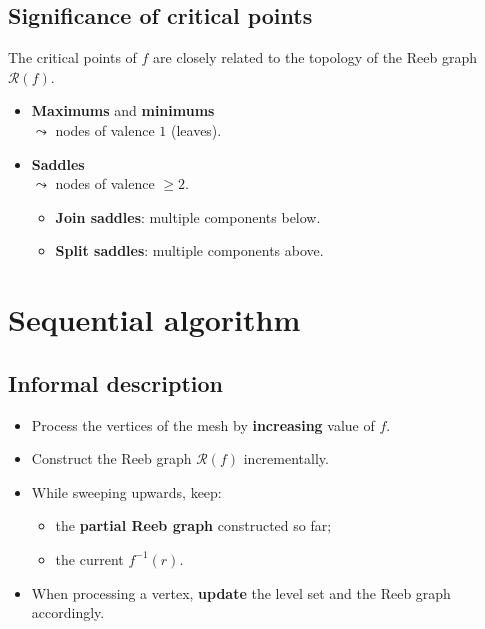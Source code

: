 \documentclass[10pt]{beamer}
\begin{document}
\subsection*{Significance of critical points}
\begin{frame*}
The critical points of $f$ are closely related to the topology of the Reeb graph $\mathcal{R}(f)$.
\begin{itemize}
\item \textbf{Maximums} and \textbf{minimums}\\
$\leadsto$ nodes of valence $1$ (leaves).
\item \textbf{Saddles}\\
$\leadsto$ nodes of valence $\ge 2$.\\
\begin{itemize}
\item \textbf{Join saddles}: multiple components below.
\item \textbf{Split saddles}: multiple components above.
\end{itemize}
\end{itemize}
\end{frame*}

\section*{Sequential algorithm}

\subsection*{Informal description}
\begin{frame*}
\begin{itemize}
\item Process the vertices of the mesh by \textbf{increasing} value of $f$.
\item Construct the Reeb graph $\mathcal{R}(f)$ incrementally.
\item While sweeping upwards, keep:
\begin{itemize}
\item the \textbf{partial Reeb graph} constructed so far;
\item the current  $f^{-1}(r)$.
\end{itemize}
\item When processing a vertex, \textbf{update} the level set and the Reeb graph accordingly.
\end{itemize}
\end{frame*}
\end{document}
